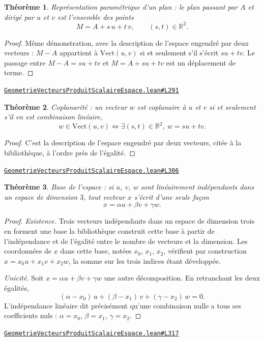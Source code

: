 \documentclass[11pt,a4paper]{article}
\theoremstyle{definition}
\theoremstyle{plain}
\newtheorem{theoreme}{Théorème}
\newcommand{\source}[2]{\par\smallskip\noindent\hfill{\footnotesize\href{#1}{\texttt{#2}}}\par\smallskip}
\begin{document}
\begin{theoreme}
Représentation paramétrique d'un plan : le plan passant par $A$ et dirigé par $u$ et $v$
est l'ensemble des points
\[ M = A + s\,u + t\,v , \qquad (s, t) \in \mathbb{R}^{2} . \]
\end{theoreme}

\begin{proof}
Même démonstration, avec la description de l'espace engendré par deux vecteurs : $M - A$
appartient à $\mathrm{Vect}(u, v)$ si et seulement s'il s'écrit $su + tv$. Le passage entre
$M - A = su + tv$ et $M = A + su + tv$ est un déplacement de terme.
\end{proof}
\source{https://github.com/Commutator-IO/learn-lean/blob/main/cours/02-lycee/08-geometrie-vecteurs-produit-scalaire-espace/GeometrieVecteursProduitScalaireEspace.lean\#L291}{GeometrieVecteursProduitScalaireEspace.lean\#L291}

\begin{theoreme}
Coplanarité : un vecteur $w$ est coplanaire à $u$ et $v$ si et seulement s'il en est
combinaison linéaire,
\[ w \in \mathrm{Vect}(u, v) \iff \exists (s, t) \in \mathbb{R}^{2},\ w = su + tv . \]
\end{theoreme}

\begin{proof}
C'est la description de l'espace engendré par deux vecteurs, citée à la bibliothèque, à
l'ordre près de l'égalité.
\end{proof}
\source{https://github.com/Commutator-IO/learn-lean/blob/main/cours/02-lycee/08-geometrie-vecteurs-produit-scalaire-espace/GeometrieVecteursProduitScalaireEspace.lean\#L306}{GeometrieVecteursProduitScalaireEspace.lean\#L306}

\begin{theoreme}
Base de l'espace : si $u$, $v$, $w$ sont linéairement indépendants dans un espace de
dimension $3$, tout vecteur $x$ s'écrit d'une seule façon
\[ x = \alpha u + \beta v + \gamma w . \]
\end{theoreme}

\begin{proof}
\emph{Existence.} Trois vecteurs indépendants dans un espace de dimension trois en forment
une base \textemdash{} la bibliothèque construit cette base à partir de l'indépendance et
de l'égalité entre le nombre de vecteurs et la dimension. Les coordonnées de $x$ dans cette
base, notées $x_0$, $x_1$, $x_2$, vérifient par construction
$x = x_0 u + x_1 v + x_2 w$, la somme sur les trois indices étant développée.

\emph{Unicité.} Soit $x = \alpha u + \beta v + \gamma w$ une autre décomposition. En
retranchant les deux égalités,
\[ (\alpha - x_0)\,u + (\beta - x_1)\,v + (\gamma - x_2)\,w = 0 . \]
L'indépendance linéaire dit précisément qu'une combinaison nulle a tous ses coefficients
nuls : $\alpha = x_0$, $\beta = x_1$, $\gamma = x_2$.
\end{proof}
\source{https://github.com/Commutator-IO/learn-lean/blob/main/cours/02-lycee/08-geometrie-vecteurs-produit-scalaire-espace/GeometrieVecteursProduitScalaireEspace.lean\#L317}{GeometrieVecteursProduitScalaireEspace.lean\#L317}
\end{document}
